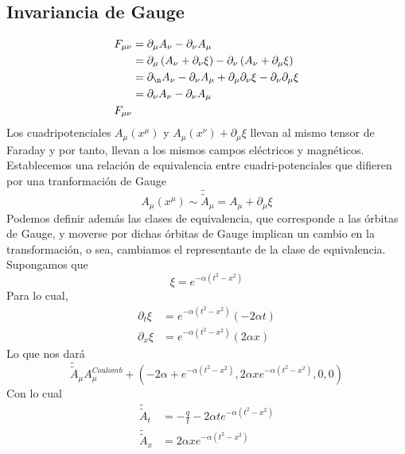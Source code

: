 \documentclass[../main.tex]{subfiles}
\begin{document}
  \subsection{Invariancia de Gauge}
\begin{align*}
  F_{\mu \nu} & = \partial_\mu A_\nu - \partial_\nu A_\mu \\
  & = \partial_\mu \left( A_\nu + \partial_\nu \xi \right) - \partial_\nu \left(A_\nu + \partial_\mu \xi \right) \\
  & = \partial_\n A_\nu - \partial_\nu A_\mu + \partial_\mu\partial_\nu \xi - \partial_\nu\partial_\mu \xi  \\
  & = \partial_\nu A_\nu - \partial_\nu A_\mu \\
  F_{\mu \nu}
\end{align*} 
Los cuadripotenciales $A_\mu(x^\mu)$ y $A_\mu(x^\nu) + \partial_\mu \xi$  llevan al mismo tensor de Faraday y por tanto, llevan a los mismos campos eléctricos y magnéticos. \\
Establecemos una relación de equivalencia entre cuadri-potenciales que difieren por una tranformación de Gauge
\begin{equation}
  A_\mu(x^\mu) \sim \tilde{\tilde{{A}}}_\mu = A_\mu + \partial_\mu \xi
 \end{equation}
Podemos definir además las clases de equivalencia, que corresponde a las órbitas de Gauge, y moverse por dichas órbitas de Gauge implican un cambio en la transformación, o sea, cambiamos el representante de la clase de equivalencia. \\
Supongamos que
\begin{equation*}
  \xi = e^{-\alpha (t^2-x^2)}
\end{equation*}
Para lo cual,
\begin{align*}
  \partial_t \xi & = e^{-\alpha (t^2-x^2)} \left( -2\alpha t \right) \\
  \partial_x \xi & = e^{-\alpha(t^2-x^2)}(2\alpha x)
\end{align*}
Lo que nos dará
\begin{equation}
  \tilde{\tilde{{A}}}_\mu A^{Coulomb}_\mu + \left( -2\alpha + e^{-\alpha(t^2-x^2)}, 2\alpha x e^{-\alpha(t^2-x^2)} , 0 , 0 \right)
 \end{equation}
 Con lo cual
 \begin{align}
   \tilde{\tilde{{A}}}_t & = -\frac{q}{t} - 2\alpha t e^{-\alpha(t^2-x^2)} \\
   \tilde{\tilde{{A}}}_x & = 2\alpha x e^{-\alpha (t^2-x^2)}
 \end{align}
\end{document}
